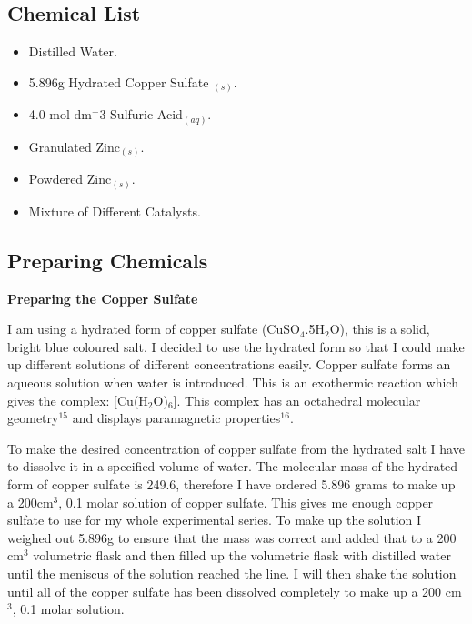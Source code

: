 	\subsection{Chemical List}
\begin{itemize}
\item Distilled Water.
\item 5.896g Hydrated Copper Sulfate ${_(s)}$.
\item 4.0 mol dm$^-3$ Sulfuric Acid${_(aq)}$.
\item Granulated Zinc${_(s)}$.
\item Powdered Zinc${_(s)}$.
\item Mixture of Different Catalysts.
\end{itemize}






	\subsection{Preparing Chemicals} \label{Preparing Chemicals}

\textbf{Preparing the Copper Sulfate}

I am using a hydrated form of copper sulfate (CuSO$_4$.5H$_2$O), this is a solid, bright blue coloured salt. I decided to use the hydrated form so that I could make up different solutions of different concentrations easily. Copper sulfate forms an aqueous solution when water is introduced. This is an exothermic reaction which gives the complex: [Cu(H$_2$O)$_6$]. This complex has an octahedral molecular geometry$^{15}$ and displays paramagnetic properties$^{16}$.

To make the desired concentration of copper sulfate from the hydrated salt I have to dissolve it in a specified volume of water. The molecular mass of the hydrated form of copper sulfate is 249.6, therefore I have ordered 5.896 grams to make up a 200cm$^3$, 0.1 molar solution of copper sulfate. This gives me enough copper sulfate to use for my whole experimental series. To make up the solution I weighed out 5.896g to ensure that the mass was correct and added that to a 200 cm$^3$ volumetric flask and then filled up the volumetric flask with distilled water until the meniscus of the solution reached the line. I will then shake the solution until all of the copper sulfate has been dissolved completely to make up a 200 cm$^3$, 0.1 molar solution.













